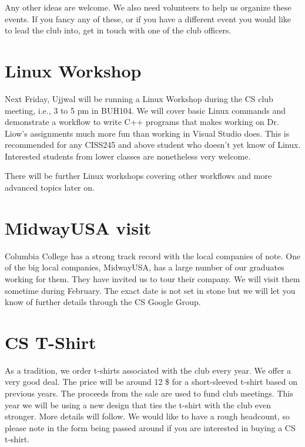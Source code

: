 Any other ideas are welcome. We also need volunteers to help us organize these
events. If you fancy any of these, or if you have a different event you would
like to lead the club into, get in touch with one of the club officers.


\newpage


\section{Linux Workshop}
\label{sec-4}

Next Friday, Ujjwal will be running a Linux Workshop during the CS club
meeting, i.e., 3 to 5 pm in BUH104. We will cover basic Linux commands and demonstrate a
workflow to write C++ programs that makes working on Dr. Liow's assignments
much more fun than working in Visual Studio does. This is recommended for any
CISS245 and above student who doesn't yet know of Linux. Interested students
from lower classes are nonetheless very welcome.

There will be further Linux workshops covering other workflows and more advanced
topics later on.


\newpage


\section{MidwayUSA visit}
\label{sec-5}

Columbia College has a strong track record with the local companies of
note. One of the big local companies, MidwayUSA, has a large number of our
graduates working for them. They have invited us to tour their company. We will
visit them sometime during February. The exact date is not set in stone but we
will let you know of further details through the CS Google Group.


\newpage


\section{CS T-Shirt}
\label{sec-6}

As a tradition, we order t-shirts associated with the club every year. We offer
a very good deal. The price will be around 12 \$ for a short-sleeved t-shirt
based on previous years. The proceeds from the sale are used to fund club
meetings. This year we will be using a new design that ties the t-shirt with
the club even stronger. More details will follow. We would like to have a rough
headcount, so please note in the form being passed around if you are interested
in buying a CS t-shirt.


